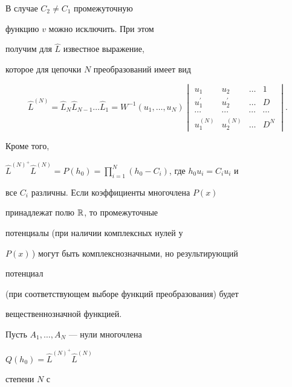 \begin{note}


В случае $C_2\ne C_1$ промежуточную


функцию $v$ можно исключить. При этом


получим для $\widehat{L}$ известное \cite{xxxiii} выражение,


которое для цепочки $N$ преобразований имеет вид


$$


\widehat{L}^{(N)}=\widehat{L}_N\widehat{L}_{N-1}\dotsc


\widehat{L}_1=W^{-1}(u_1,\dotsc,u_N)


\begin{vmatrix}


u_1 & u_2 & \dotsc  & 1 \\


u_1^{\prime } & u_2^{\prime } & \dotsc  & D \\


\cdots  & \cdots  & \cdots  & \cdots  \\


u_1^{(N)} & u_2^{(N)} & \dotsc  & D^N


\end{vmatrix}


.


$$


Кроме того,


$\widehat{L}^{(N)^{+}}\widehat{L}^{(N)}=P(h_0)=


\prod\limits_{i=1}^N(h_0-C_i)$, где $h_0u_i=C_iu_i$ и


все $C_i$ различны. Если коэффициенты многочлена $P(x)$


принадлежат полю ${\Bbb R} $, то промежуточные


потенциалы (при наличии комплексных нулей у


$P(x)$\,) могут быть комплекснозначными, но результирующий


потенциал


(при соответствующем выборе функций преобразования) будет


вещественнозначной функцией.


\end{note}





Пусть $A_1,\dotsc ,A_N$ --- нули многочлена


$Q(h_0)=\widehat{L}^{(N) ^{+}}\widehat{L}^{(N)}$


степени $N$ с


